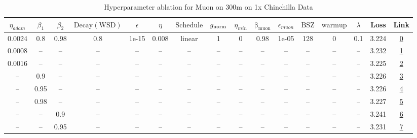 \begin{table}[H]
\centering
\caption{Hyperparameter ablation for Muon on 300m on 1x Chinchilla Data}
\label{tab:ablation_muon_300m_on_1x_chinchilla_data}
\begin{tabular}{cccccccccccccccc}
\toprule
$\eta_{adam}$ & $\beta_1$ & $\beta_2$ & $\mathrm{Decay (WSD)}$ & $\epsilon$ & $\eta$ & $\mathrm{Schedule}$ & $g_{\mathrm{norm}}$ & $\eta_{min}$ & $\mathrm{\beta_{muon}}$ & $\epsilon_{muon}$ & $\mathrm{BSZ}$ & $\mathrm{warmup}$ & $\lambda$ & Loss & Link \\
\midrule
0.0024 & 0.8 & 0.98 & 0.8 & 1e-15 & 0.008 & linear & 1 & 0 & 0.98 & 1e-05 & 128 & 0 & 0.1 & 3.224 & \href{https://wandb.ai/marin-community/optimizer-scaling/runs/sweep-300m-6B-muon103aa7lr0.008-wd0.1-minlr0-warmup0-b10.8-b20.9-299b18}{0} \\
\midrule
0.0008 & -- & -- & -- & -- & -- & -- & -- & -- & -- & -- & -- & -- & -- & 3.232 & \href{https://wandb.ai/marin-community/optimizer-scaling/runs/sweep-300m-6B-muona697c4lr0.008-wd0.1-minlr0-warmup0-b10.8-b20.9-58f541}{1} \\
0.0016 & -- & -- & -- & -- & -- & -- & -- & -- & -- & -- & -- & -- & -- & 3.225 & \href{https://wandb.ai/marin-community/optimizer-scaling/runs/sweep-300m-6B-muon801ddclr0.008-wd0.1-minlr0-warmup0-b10.8-b20.9-551f94}{2} \\
-- & 0.9 & -- & -- & -- & -- & -- & -- & -- & -- & -- & -- & -- & -- & 3.226 & \href{https://wandb.ai/marin-community/optimizer-scaling/runs/sweep-300m-6B-muon1fae7blr0.008-wd0.1-minlr0-warmup0-b10.9-b20.9-ce27cb}{3} \\
-- & 0.95 & -- & -- & -- & -- & -- & -- & -- & -- & -- & -- & -- & -- & 3.226 & \href{https://wandb.ai/marin-community/optimizer-scaling/runs/sweep-300m-6B-muon478bc1lr0.008-wd0.1-minlr0-warmup0-b10.95-b20.-ead356}{4} \\
-- & 0.98 & -- & -- & -- & -- & -- & -- & -- & -- & -- & -- & -- & -- & 3.227 & \href{https://wandb.ai/marin-community/optimizer-scaling/runs/sweep-300m-6B-muone28078lr0.008-wd0.1-minlr0-warmup0-b10.98-b20.-1e1d01}{5} \\
-- & -- & 0.9 & -- & -- & -- & -- & -- & -- & -- & -- & -- & -- & -- & 3.241 & \href{https://wandb.ai/marin-community/optimizer-scaling/runs/sweep-300m-6B-muon2aaf08lr0.008-wd0.1-minlr0-warmup0-b10.8-b20.9-5e17f0}{6} \\
-- & -- & 0.95 & -- & -- & -- & -- & -- & -- & -- & -- & -- & -- & -- & 3.231 & \href{https://wandb.ai/marin-community/optimizer-scaling/runs/sweep-300m-6B-muon21c0a4lr0.008-wd0.1-minlr0-warmup0-b10.8-b20.9-c8ff38}{7} \\

\end{tabular}
\end{table}
